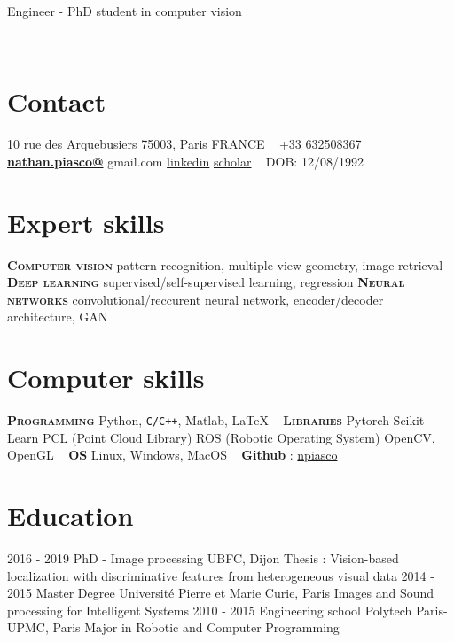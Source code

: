 \documentclass[]{friggeri-cv}
\begin{document}
      {Engineer - PhD student in computer vision}
      
\vspace{10pt}
\vspace{1pt}

\begin{aside}
  ~
  \section{Contact}
    10 rue des Arquebusiers
    75003, Paris
    FRANCE
    ~
    +33 632508367
    ~
   	\href{mailto:nathan.piasco@gmail.com}{\textbf{nathan.piasco@}}
   	gmail.com
	{\href{https://www.linkedin.com/in/nathan-piasco-a4766aa5/}{\textcolor{pblue}{linkedin}}}
	{\href{https://scholar.google.fr/citations?user=S3zYmOYAAAAJ&hl=fr}{\textcolor{pblue}{scholar}}}
	~
    DOB: 12/08/1992
  \section{Expert skills} 
    \textbf{\small{\textsc{Computer vision}}}
    pattern recognition, multiple view geometry, image retrieval
    \textbf{\small{\textsc{Deep learning}}}
    supervised/self-supervised learning, regression
    \textbf{\small{\textsc{Neural networks}}}
    convolutional/reccurent neural network, encoder/decoder architecture, GAN
  \section{Computer skills}
    \textbf{\textsc{\textsc{Programming}}}
    Python, \texttt{C/C++},
    Matlab,  \LaTeX
    ~
    \textbf{\textsc{Libraries}}
    Pytorch
    Scikit Learn
    PCL (Point Cloud Library)
    ROS (Robotic Operating System)
    OpenCV, OpenGL
    ~
    \textbf{\textsc{OS}}
    Linux, Windows, MacOS
    ~
    \textbf{{Github}} : {\href{https://github.com/npiasco}{\textcolor{pblue}{npiasco}}}
\end{aside}

\section{Education}
\begin{entrylist}
  \entry
    {2016 - 2019}
    {PhD - Image processing}
    {UBFC, Dijon}
    {Thesis : Vision-based localization with discriminative features from heterogeneous visual data}
  \entry
    {2014 - 2015}
    {Master Degree}
    {Universit\'e Pierre et Marie Curie, Paris}
    {Images and Sound processing for Intelligent Systems}
  \entry
    {2010 - 2015}
    {Engineering school}
    {Polytech Paris-UPMC, Paris}
    {Major in Robotic and Computer Programming}
\end{entrylist}
\end{document}
